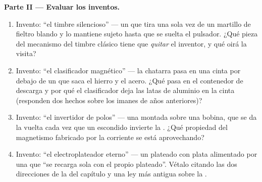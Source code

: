 \begin{problem}
\medskip\noindent\textbf{Parte II --- Evaluar los inventos.}
\begin{enumerate}[resume]
  \item Invento: ``el timbre silencioso'' --- un
         que tira una sola vez de un martillo de
        fieltro blando y lo mantiene sujeto hasta que se suelta el
        pulsador. ¿Qué pieza del mecanismo del timbre clásico tiene
        que \emph{quitar} el inventor, y qué oirá la visita?
  \item Invento: ``el clasificador magnético'' --- la chatarra pasa
        en una cinta por debajo de un  que saca el
        hierro y el acero. ¿Qué pasa en el contenedor de descarga y
        por qué el clasificador deja las latas de aluminio en la
        cinta (responden dos hechos sobre los imanes de años
        anteriores)?
  \item Invento: ``el invertidor de polos'' --- una 
        montada sobre una bobina, que se da la vuelta cada vez que
        un  escondido invierte la . ¿Qué
        propiedad del magnetismo fabricado por la corriente se está
        aprovechando?
  \item Invento: ``el electroplateador eterno'' --- un plateado con
        plata alimentado por una  que ``se recarga sola con el
        propio plateado''. Vétalo citando las dos direcciones de la
         del capítulo y una ley más antigua sobre la
        .
\end{enumerate}


\end{problem}
